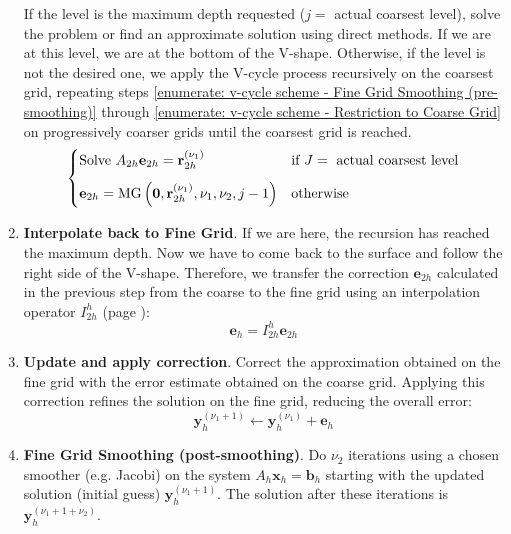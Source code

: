 \begin{enumerate}
    If the level is the maximum depth requested ($j = $ actual coarsest level), solve the problem or find an approximate solution using direct methods. If we are at this level, we are at the bottom of the V-shape. Otherwise, if the level is not the desired one, we apply the V-cycle process recursively on the coarsest grid, repeating steps \ref{enumerate: v-cycle scheme - Fine Grid Smoothing (pre-smoothing)} through \ref{enumerate: v-cycle scheme - Restriction to Coarse Grid} on progressively coarser grids until the coarsest grid is reached.
    \begin{equation*}
        \begin{cases}
            \text{Solve } A_{2h}\mathbf{e}_{2h} = \mathbf{r}_{2h}^{\left(\nu_{1}\right)} & \text{if } J = \text{ actual coarsest level} \vspace{.8em}\\
            \mathbf{e}_{2h} = \mathrm{MG}\left(\mathbf{0}, \mathbf{r}_{2h}^{\left(\nu_{1}\right)}, \nu_{1}, \nu_{2}, j-1\right) & \text{otherwise}
        \end{cases}
    \end{equation*}

    \item\label{enumerate: v-cycle scheme - Interpolate back to Fine Grid} \textbf{Interpolate back to Fine Grid}. If we are here, the recursion has reached the maximum depth. Now we have to come back to the surface and follow the right side of the V-shape. Therefore, we transfer the correction $\mathbf{e}_{2h}$ calculated in the previous step from the coarse to the fine grid using an interpolation operator $I_{2h}^{h}$ (page \pageref{subsubsection: Interpolation Operator}):
    \begin{equation*}
        \mathbf{e}_{h} = I_{2h}^{h} \mathbf{e}_{2h}
    \end{equation*}

    \item \textbf{Update and apply correction}. Correct the approximation obtained on the fine grid with the error estimate obtained on the coarse grid. Applying this correction refines the solution on the fine grid, reducing the overall error:
    \begin{equation*}
        \mathbf{y}_{h}^{\left(\nu_{1}+1\right)} \leftarrow \mathbf{y}_{h}^{\left(\nu_{1}\right)} + \mathbf{e}_{h}
    \end{equation*}

    \item \textbf{Fine Grid Smoothing (post-smoothing)}. Do $\nu_{2}$ iterations using a chosen smoother (e.g. Jacobi) on the system $A_{h}\mathbf{x}_{h} = \mathbf{b}_{h}$ starting with the updated solution (initial guess) $\mathbf{y}_{h}^{\left(\nu_{1}+1\right)}$. The solution after these iterations is $\mathbf{y}_{h}^{\left(\nu_{1}+1+\nu_{2}\right)}$.
    

\end{enumerate}
